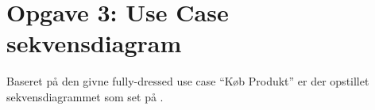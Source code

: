 \section{Opgave 3: Use Case sekvensdiagram}

Baseret på den givne fully-dressed use case ``Køb Produkt'' er der opstillet sekvensdiagrammet som set på .

